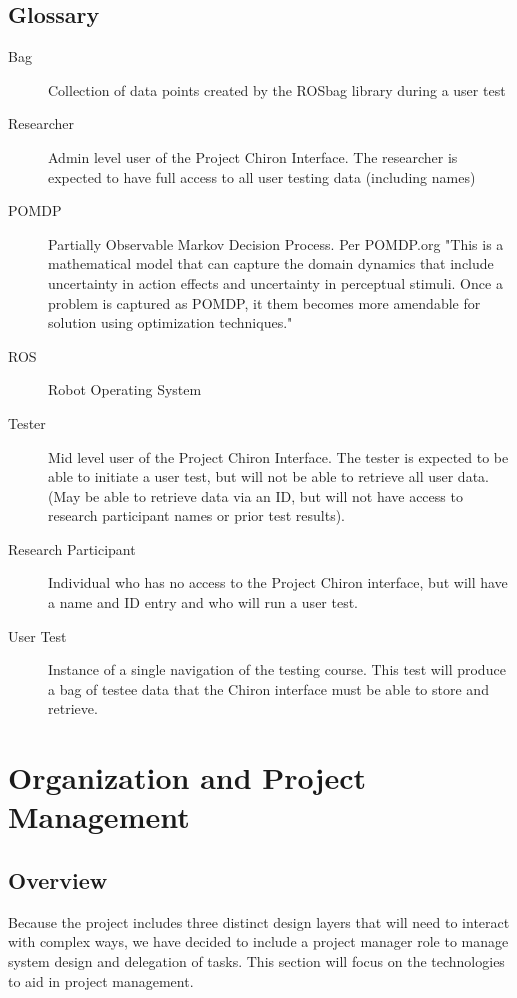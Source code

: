 \documentclass[onecolumn, draftclsnofoot,10pt, compsoc]{IEEEtran}
\begin{document}
\subsection{Glossary}
\begin{description}
	\item [Bag] \hfill \break Collection of data points created by the ROSbag library during a user test
	\item [Researcher] \hfill \break Admin level user of the Project Chiron Interface. The researcher is expected to have full access to all user testing data (including names)
	\item [POMDP] \hfill \break Partially Observable Markov Decision Process. Per POMDP.org "This is a mathematical model that can capture the domain dynamics that include uncertainty in action effects and uncertainty in perceptual stimuli. Once a problem is captured as POMDP, it them becomes more amendable for solution using optimization techniques."  \cite{POMDP}
	\item [ROS] \hfill \break Robot Operating System
	\item [Tester] \hfil \break Mid level user of the Project Chiron Interface. The tester is expected to be able to initiate a user test, but will not be able to retrieve all user data. (May be able to retrieve data via an ID, but will not have access to research participant names or prior test results).
	\item [Research Participant] \hfill \break Individual who has no access to the Project Chiron interface, but will have a name and ID entry and who will run a user test.
	\item [User Test] \hfill \break Instance of a single navigation of the testing course. This test will produce a bag of testee data that the Chiron interface must be able to store and retrieve.
\end{description}
\section{Organization and Project Management}
\subsection{Overview}
Because the project includes three distinct design layers that will need to interact with complex ways, we have decided to include a project manager role to manage system design and delegation of tasks. This section will focus on the technologies to aid in project management.
\end{document}
